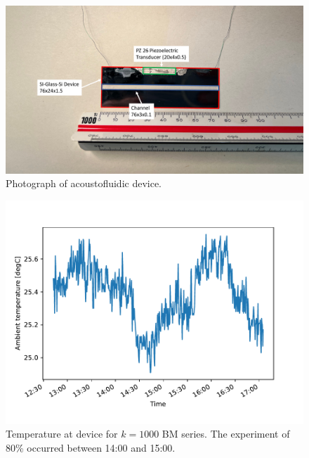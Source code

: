 \newpage
\begin{figure}[tbp]
  \centering
  \includegraphics[width=\textwidth]{SECTION/15_Figures/Supplemental_Device.pdf}
  \caption{Photograph of acoustofluidic device.}
\end{figure}

\newpage
\begin{figure}[tbp]
  \centering
  \includegraphics[width=\textwidth]{SECTION/15_Figures/temperature.pdf}
  \caption{Temperature at device for $k=1000$ BM series. The experiment of 80\% 
  occurred between 14:00 and 15:00.}
\end{figure}

